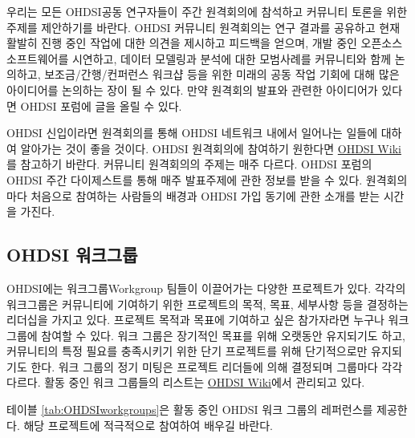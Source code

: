 \documentclass[11pt]{book}
\theoremstyle{definition}
\theoremstyle{definition}
\theoremstyle{definition}
\theoremstyle{remark}
\begin{document}
우리는 모든 OHDSI공동 연구자들이 주간 원격회의에 참석하고 커뮤니티
토론을 위한 주제를 제안하기를 바란다. OHDSI 커뮤니티 원격회의는 연구
결과를 공유하고 현재 활발히 진행 중인 작업에 대한 의견을 제시하고
피드백을 얻으며, 개발 중인 오픈소스 소프트웨어를 시연하고, 데이터
모델링과 분석에 대한 모범사례를 커뮤니티와 함께 논의하고,
보조금/간행/컨퍼런스 워크샵 등을 위한 미래의 공동 작업 기회에 대해 많은
아이디어를 논의하는 장이 될 수 있다. 만약 원격회의 발표와 관련한
아이디어가 있다면 OHDSI 포럼에 글을 올릴 수 있다.

OHDSI 신입이라면 원격회의를 통해 OHDSI 네트워크 내에서 일어나는 일들에
대하여 알아가는 것이 좋을 것이다. OHDSI 원격회의에 참여하기 원한다면
\href{https://www.ohdsi.org/web/wiki/doku.php?id=projects:ohdsi_community}{OHDSI
Wiki}를 참고하기 바란다. 커뮤니티 원격회의의 주제는 매주 다르다. OHDSI
포럼의 OHDSI 주간 다이제스트를 통해 매주 발표주제에 관한 정보를 받을 수
있다. 원격회의마다 처음으로 참여하는 사람들의 배경과 OHDSI 가입 동기에
관한 소개를 받는 시간을 가진다. 

\hypertarget{ohdsi-}{\subsection{OHDSI 워크그룹}\label{ohdsi-}}

OHDSI에는 워크그룹Workgroup 팀들이 이끌어가는 다양한 프로젝트가 있다.
각각의 워크그룹은 커뮤니티에 기여하기 위한 프로젝트의 목적, 목표,
세부사항 등을 결정하는 리더십을 가지고 있다. 프로젝트 목적과 목표에
기여하고 싶은 참가자라면 누구나 워크그룹에 참여할 수 있다. 워크 그룹은
장기적인 목표를 위해 오랫동안 유지되기도 하고, 커뮤니티의 특정 필요를
충족시키기 위한 단기 프로젝트를 위해 단기적으로만 유지되기도 한다. 워크
그룹의 정기 미팅은 프로젝트 리더들에 의해 결정되며 그룹마다 각각 다르다.
활동 중인 워크 그룹들의 리스트는
\href{https://www.ohdsi.org/web/wiki/doku.php?id=projects:overview}{OHDSI
Wiki}에서 관리되고 있다. 

테이블 \ref{tab:OHDSIworkgroups}은 활동 중인 OHDSI 워크 그룹의
레퍼런스를 제공한다. 해당 프로젝트에 적극적으로 참여하여 배우길 바란다.
\end{document}
